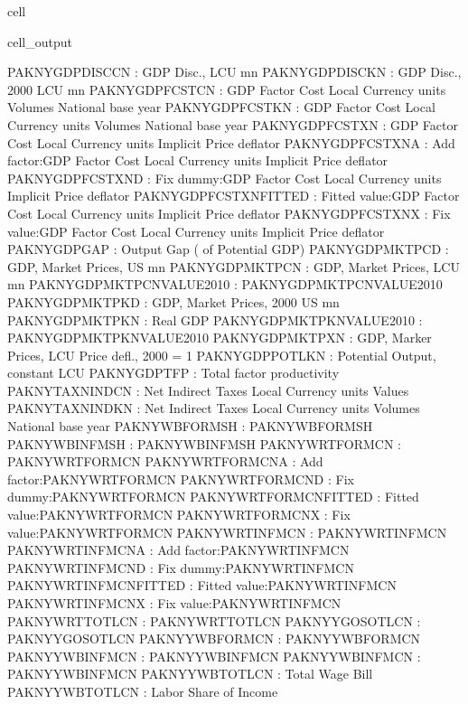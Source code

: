 \documentclass[letterpaper,10pt,english]{jupyterBook}
\begin{document}
\begin{sphinxuseclass}{cell}
\begin{sphinxVerbatimOutput}
\begin{sphinxuseclass}{cell_output}
\begin{sphinxVerbatim}[commandchars=\\\{\}]
PAKNYGDPDISCCN            : GDP Disc., LCU mn
PAKNYGDPDISCKN            : GDP Disc., 2000 LCU mn
PAKNYGDPFCSTCN            : GDP Factor Cost Local Currency units Volumes National base year
PAKNYGDPFCSTKN            : GDP Factor Cost Local Currency units Volumes National base year
PAKNYGDPFCSTXN            : GDP Factor Cost Local Currency units Implicit Price deflator
PAKNYGDPFCSTXN\PYGZus{}A          : Add factor:GDP Factor Cost Local Currency units Implicit Price deflator
PAKNYGDPFCSTXN\PYGZus{}D          : Fix dummy:GDP Factor Cost Local Currency units Implicit Price deflator
PAKNYGDPFCSTXN\PYGZus{}FITTED     : Fitted  value:GDP Factor Cost Local Currency units Implicit Price deflator
PAKNYGDPFCSTXN\PYGZus{}X          : Fix value:GDP Factor Cost Local Currency units Implicit Price deflator
PAKNYGDPGAP\PYGZus{}              : Output Gap (\PYGZpc{} of Potential GDP)
PAKNYGDPMKTPCD            : GDP, Market Prices, US\PYGZdl{} mn
PAKNYGDPMKTPCN            : GDP, Market Prices, LCU mn
PAKNYGDPMKTPCN\PYGZus{}VALUE\PYGZus{}2010 : PAKNYGDPMKTPCN\PYGZus{}VALUE\PYGZus{}2010
PAKNYGDPMKTPKD            : GDP, Market Prices, 2000 US\PYGZdl{} mn
PAKNYGDPMKTPKN            : Real GDP
PAKNYGDPMKTPKN\PYGZus{}VALUE\PYGZus{}2010 : PAKNYGDPMKTPKN\PYGZus{}VALUE\PYGZus{}2010
PAKNYGDPMKTPXN            : GDP, Marker Prices, LCU Price defl., 2000 = 1
PAKNYGDPPOTLKN            : Potential Output, constant LCU
PAKNYGDPTFP               : Total factor productivity
PAKNYTAXNINDCN            : Net Indirect Taxes Local Currency units Values
PAKNYTAXNINDKN            : Net Indirect Taxes Local Currency units Volumes National base year
PAKNYWBFORMSH             : PAKNYWBFORMSH
PAKNYWBINFMSH             : PAKNYWBINFMSH
PAKNYWRTFORMCN            : PAKNYWRTFORMCN
PAKNYWRTFORMCN\PYGZus{}A          : Add factor:PAKNYWRTFORMCN
PAKNYWRTFORMCN\PYGZus{}D          : Fix dummy:PAKNYWRTFORMCN
PAKNYWRTFORMCN\PYGZus{}FITTED     : Fitted  value:PAKNYWRTFORMCN
PAKNYWRTFORMCN\PYGZus{}X          : Fix value:PAKNYWRTFORMCN
PAKNYWRTINFMCN            : PAKNYWRTINFMCN
PAKNYWRTINFMCN\PYGZus{}A          : Add factor:PAKNYWRTINFMCN
PAKNYWRTINFMCN\PYGZus{}D          : Fix dummy:PAKNYWRTINFMCN
PAKNYWRTINFMCN\PYGZus{}FITTED     : Fitted  value:PAKNYWRTINFMCN
PAKNYWRTINFMCN\PYGZus{}X          : Fix value:PAKNYWRTINFMCN
PAKNYWRTTOTLCN            : PAKNYWRTTOTLCN
PAKNYYGOSOTLCN            : PAKNYYGOSOTLCN
PAKNYYWBFORMCN            : PAKNYYWBFORMCN
PAKNYYWBINFMCN            : PAKNYYWBINFMCN
PAKNYYWBINFMCN\PYGZus{}           : PAKNYYWBINFMCN\PYGZus{}
PAKNYYWBTOTLCN            : Total Wage Bill
PAKNYYWBTOTLCN\PYGZus{}           : Labor Share of Income
\end{sphinxVerbatim}

\end{sphinxuseclass}\end{sphinxVerbatimOutput}

\end{sphinxuseclass}
\end{document}
